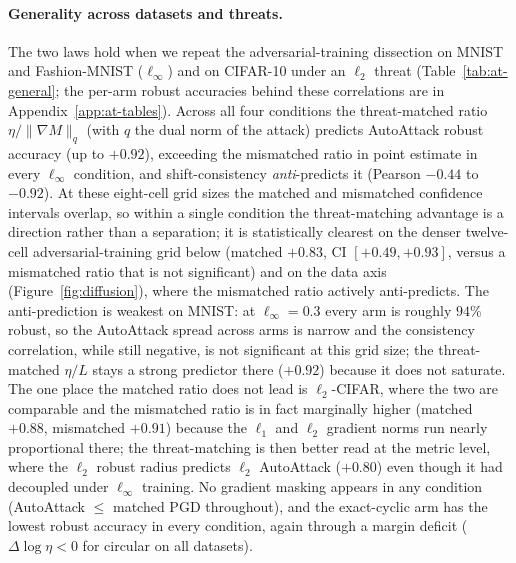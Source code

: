 \documentclass{article}
\theoremstyle{definition}
\begin{document}
\paragraph{Generality across datasets and threats.} The two laws hold when we repeat the adversarial-training dissection on MNIST and Fashion-MNIST ($\ell_\infty$) and on CIFAR-10 under an $\ell_2$ threat (Table~\ref{tab:at-general}; the per-arm robust accuracies behind these correlations are in Appendix~\ref{app:at-tables}). Across all four conditions the threat-matched ratio $\eta/\|\nabla M\|_q$ (with $q$ the dual norm of the attack) predicts AutoAttack robust accuracy (up to $+0.92$), exceeding the mismatched ratio in point estimate in every $\ell_\infty$ condition, and shift-consistency \emph{anti}-predicts it (Pearson $-0.44$ to $-0.92$). At these eight-cell grid sizes the matched and mismatched confidence intervals overlap, so within a single condition the threat-matching advantage is a direction rather than a separation; it is statistically clearest on the denser twelve-cell adversarial-training grid below (matched $+0.83$, CI $[+0.49,+0.93]$, versus a mismatched ratio that is not significant) and on the data axis (Figure~\ref{fig:diffusion}), where the mismatched ratio actively anti-predicts. The anti-prediction is weakest on MNIST: at $\ell_\infty{=}0.3$ every arm is roughly $94\%$ robust, so the AutoAttack spread across arms is narrow and the consistency correlation, while still negative, is not significant at this grid size; the threat-matched $\eta/L$ stays a strong predictor there ($+0.92$) because it does not saturate. The one place the matched ratio does not lead is $\ell_2$-CIFAR, where the two are comparable and the mismatched ratio is in fact marginally higher (matched $+0.88$, mismatched $+0.91$) because the $\ell_1$ and $\ell_2$ gradient norms run nearly proportional there; the threat-matching is then better read at the metric level, where the $\ell_2$ robust radius predicts $\ell_2$ AutoAttack ($+0.80$) even though it had decoupled under $\ell_\infty$ training. No gradient masking appears in any condition (AutoAttack $\le$ matched PGD throughout), and the exact-cyclic arm has the lowest robust accuracy in every condition, again through a margin deficit ($\Delta\log\eta<0$ for circular on all datasets).
\end{document}
